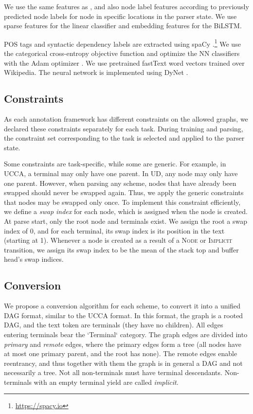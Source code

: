 \documentclass[11pt,a4paper]{article}
\begin{document}
We use the same features as \citet{hershcovich2017a}, and also node label features according to
previously predicted node labels for node in specific locations in the parser state.
We use sparse features for the linear classifier and embedding features for the BiLSTM.

POS tags and syntactic dependency labels are extracted using spaCy
\cite{spacy2}.\footnote{\url{https://spacy.io}}
We use the categorical cross-entropy objective function and optimize the
NN classifiers with the Adam optimizer \cite{kingma2014adam}.
We use pretrained fastText word vectors \cite{bojanowski2016enriching} trained over Wikipedia.
The neural network is implemented using DyNet \cite{neubig2017dynet}.


\subsection{Constraints}

As each annotation framework has different constraints on the allowed graphs,
we declared these constraints separately for each task.
During training and parsing, the constraint set corresponding to the task is
selected and applied to the parser state.

Some constraints are task-specific, while some are generic.
For example, in UCCA, a terminal may only have one parent.
In UD, any node may only have one parent.
However, when parsing any scheme, nodes that have already been swapped
should never be swapped again.
Thus, we apply the generic constraints that nodes may be swapped only once.
To implement this constraint efficiently, we define a \textit{swap index}
for each node, which is assigned when the node is created.
At parse start, only the root node and terminals exist.
We assign the root a swap index of 0, and for each terminal, its swap index
is its position in the text (starting at 1).
Whenever a node is created as a result of a \textsc{Node} or \textsc{Implicit}
transition, we assign its swap index to be the mean of the stack top and buffer
head's swap indices.


\subsection{Conversion}\label{sec:conversion}

We propose a conversion algorithm for each scheme,
to convert it into a unified DAG format, similar to the UCCA format.
In this format, the graph is a rooted DAG, and the text token are terminals
(they have no children).
All edges entering terminals bear the `Terminal` category.
The graph edges are divided into \textit{primary} and \textit{remote} edges,
where the primary edges form a tree (all nodes have at most one primary parent,
and the root has none).
The remote edges enable reentrancy, and thus together with them the graph
is in general a DAG and not necessarily a tree.
Not all non-terminals must have terminal descendants.
Non-terminals with an empty terminal yield are called \textit{implicit}.
\end{document}
